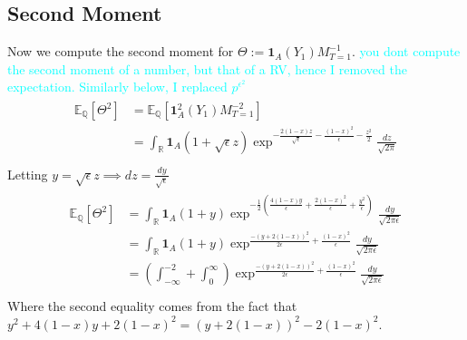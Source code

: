 \documentclass[11pt]{amsart}
\newcommand{\want}{p^{\epsilon}}
\newcommand{\noise}{\sqrt{\epsilon}}
\newcommand{\E}{\mathbb{E}}
\newcommand{\ind}{\mathbf{1}}
\newcommand{\R}{\mathbb{R}}
\newcommand{\ydnote}[1]{{\textcolor{cyan}{#1}}}
\begin{document}
\subsection{Second Moment}
Now we compute the second moment for
$\Theta :=\ind_{A}(Y_1) M_{T=1}^{-1}$.
\ydnote{you dont compute the second moment of a number, but that of
  a RV, hence I removed the expectation. Similarly below, I replaced
  $\want^2$}
\begin{align}
  \begin{split}
    \E_{\mathbb{Q}}[\Theta^2]
    &= \E_{\mathbb{Q}}[\ind_{A}^2(Y_1) M_{T=1}^{-2}] \\
    &= \int_{\R} \ind_{A}(1+\noise z)
    \exp^{-\frac{2(1-x)z}{\noise}-\frac{(1-x)^2}{\epsilon}-\frac{z^2}{2}}
    \frac{dz}{\sqrt{2\pi}} \\
  \end{split}
\end{align}
Letting $y = \noise z \implies dz = \frac{dy}{\noise}$
\begin{align}
  \begin{split}
    \E_{\mathbb{Q}}[\Theta^2]
    &= \int_{\R} \ind_{A}(1+y)
    \exp^{-\frac{1}{2}(\frac{4(1-x)y}{\epsilon}+\frac{2(1-x)^2}{\epsilon}+\frac{y^2}{\epsilon})}
    \frac{dy}{\sqrt{2\pi\epsilon}} \\
    &= \int_{\R} \ind_{A}(1+y)
    \exp^{\frac{-(y+2(1-x))^2}{2\epsilon}+\frac{(1-x)^2}{\epsilon}}
    \frac{dy}{\sqrt{2\pi\epsilon}}\\
    &= (\int_{-\infty}^{-2}+\int_{0}^{\infty})
    \exp^{\frac{-(y+2(1-x))^2}{2\epsilon}+\frac{(1-x)^2}{\epsilon}}
    \frac{dy}{\sqrt{2\pi\epsilon}}\\
  \end{split}
\end{align}
Where the second equality comes from the fact that
$y^2+4(1-x)y+2(1-x)^2=(y+2(1-x))^2-2(1-x)^2$.
\end{document}
